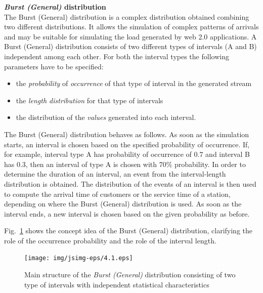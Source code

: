 \textbf{\emph{Burst (General)} distribution}\\
The Burst (General) distribution is a complex distribution
obtained combining two different distributions. It allows the
simulation of complex patterns of arrivals and may be suitable for
simulating the load generated by web 2.0 applications. A Burst
(General) distribution consists of two different types of
intervals (A and B) independent among each other. For both the
interval types the following parameters have to be specified:
\begin{itemize}
\item the \emph{probability} of \emph{occurrence} of that type of
interval in the generated stream \item the \emph{length
distribution} for that type of intervals \item the distribution of
the \emph{values} generated into each interval.
\end{itemize}
The Burst (General) distribution behaves as follows. As soon as
the simulation starts, an interval is chosen based on the
specified probability of occurrence. If, for example, interval
type A has probability of occurrence of 0.7 and interval B has
0.3, then an interval of type A is chosen with 70\% probability.
In order to determine the duration of an interval, an event from
the interval-length distribution is obtained. The distribution of
the events of an interval is then used to compute the arrival time
of customers or the service time of a station, depending on where
the Burst (General) distribution is used. As soon as the interval
ends, a new interval is chosen based on the given probability as
before.

Fig.~\ref{fig:strburdistr} shows the concept idea of the Burst
(General) distribution, clarifying the role of the occurrence
probability and the role of the interval length.
\begin{figure}[htb]
    \begin{center}
        \texttt{[image: img/jsimg-eps/4.1.eps]}
    \end{center}
    \caption{Main structure of the \emph{Burst (General)} distribution consisting
    of two type of intervals with independent statistical characteristics}
    \label{fig:strburdistr}
\end{figure}\\

